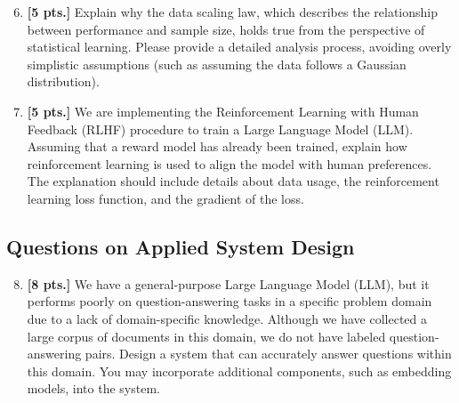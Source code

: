 \documentclass[11pt,a4paper]{article}
\begin{document}
\begin{enumerate}[label=\textbf{\arabic*.}]\setcounter{enumii}{5}
    \item \textbf{[5 pts.]} Explain why the data scaling law, which describes the relationship between performance and sample size, holds true from the perspective of statistical learning. Please provide a detailed analysis process, avoiding overly simplistic assumptions (such as assuming the data follows a Gaussian distribution).

    \item \textbf{[5 pts.]} We are implementing the Reinforcement Learning with Human Feedback (RLHF) procedure to train a Large Language Model (LLM). Assuming that a reward model has already been trained, explain how reinforcement learning is used to align the model with human preferences. The explanation should include details about data usage, the reinforcement learning loss function, and the gradient of the loss.
\end{enumerate}

\subsection*{Questions on Applied System Design}

\begin{enumerate}[label=\textbf{\arabic*.}]\setcounter{enumii}{7}
    \item \textbf{[8 pts.]} We have a general-purpose Large Language Model (LLM), but it performs poorly on question-answering tasks in a specific problem domain due to a lack of domain-specific knowledge. Although we have collected a large corpus of documents in this domain, we do not have labeled question-answering pairs. Design a system that can accurately answer questions within this domain. You may incorporate additional components, such as embedding models, into the system.
\end{enumerate}
\end{document}
